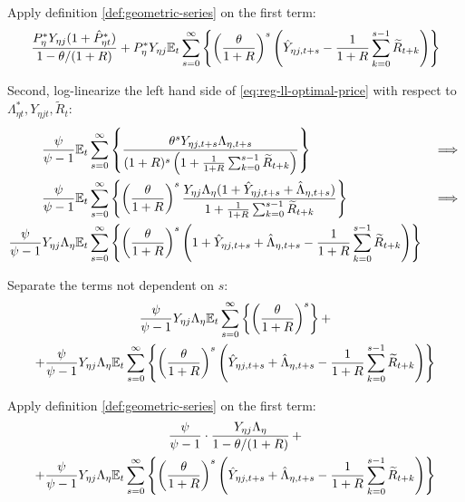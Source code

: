\documentclass[
thesis.tex
]{subfiles}
\begin{document}
Apply definition \ref{def:geometric-series} on the first term:
\begin{align}
	\frac{ P_{\eta}^{\ast} Y_{\eta j} ( 1 + \hat{P}_{\eta t}^{\ast} )}{1-\theta /(1+R)} + P_{\eta}^{\ast} Y_{\eta j} {\mathbb{E}_{t}} \sum_{s=0}^{\infty} \left\{ \left( \frac{\theta}{1 + R} \right)^s \left( \hat{Y}_{\eta j, t+s} - \frac{1}{1 + R} \sum_{k=0}^{s-1} \widetilde{R}_{t+k} \right) \right\} \nonumber
\end{align}

Second, log-linearize the left hand side of \ref{eq:reg-ll-optimal-price} with respect to \( \Lambda_{\eta t}^{\ast}, Y_{\eta j t}, \widetilde{R}_t \):
\begin{alignat}{2}
	\frac{\psi}{\psi-1} &{\mathbb{E}_{t}} \sum_{s=0}^{\infty} \left\{ \frac{\theta^s Y_{\eta j,t+s} \Lambda_{\eta, t+s}}{ (1 + R)^s \left( 1 + \frac{1}{1 + R} \sum_{k=0}^{s-1} \widetilde{R}_{t+k} \right)} \right\} & \implies \nonumber \\
	\frac{\psi}{\psi-1} &{\mathbb{E}_{t}} \sum_{s=0}^{\infty} \left\{ \left( \frac{\theta}{1 + R} \right)^s \frac{ Y_{\eta j} \Lambda_{\eta} (1+ \hat{Y}_{\eta j, t+s} + \hat{\Lambda}_{\eta, t+s})}{ 1 + \frac{1}{1 + R} \sum_{k=0}^{s-1} \widetilde{R}_{t+k}} \right\} & \implies \nonumber \\
	\frac{\psi}{\psi-1} Y_{\eta j} \Lambda_{\eta} &{\mathbb{E}_{t}} \sum_{s=0}^{\infty} \left\{ \left( \frac{\theta}{1 + R} \right)^s \left( 1+ \hat{Y}_{\eta j, t+s} + \hat{\Lambda}_{\eta, t+s} - \frac{1}{1 + R} \sum_{k=0}^{s-1} \widetilde{R}_{t+k} \right) \right\} & \nonumber
\end{alignat}

Separate the terms not dependent on $s$:
\begin{multline}
	\frac{\psi}{\psi-1} Y_{\eta j} \Lambda_{\eta} {\mathbb{E}_{t}} \sum_{s=0}^{\infty} \left\{ \left( \frac{\theta}{1 + R} \right)^s \right\} + 
	\\
	+ \frac{\psi}{\psi-1} Y_{\eta j} \Lambda_{\eta} {\mathbb{E}_{t}} \sum_{s=0}^{\infty} \left\{ \left( \frac{\theta}{1 + R} \right)^s \left( \hat{Y}_{\eta j, t+s} + \hat{\Lambda}_{\eta, t+s} - \frac{1}{1 + R} \sum_{k=0}^{s-1} \widetilde{R}_{t+k} \right) \right\} \nonumber
\end{multline}

Apply definition \ref{def:geometric-series} on the first term:
\begin{multline}
	\frac{\psi}{\psi-1} \cdot \frac{Y_{\eta j} \Lambda_{\eta}}{1-\theta /(1+R)} \, + 
	\\
	+ \frac{\psi}{\psi-1} Y_{\eta j} \Lambda_{\eta} {\mathbb{E}_{t}} \sum_{s=0}^{\infty} \left\{ \left( \frac{\theta}{1 + R} \right)^s \left( \hat{Y}_{\eta j, t+s} + \hat{\Lambda}_{\eta, t+s} - \frac{1}{1 + R} \sum_{k=0}^{s-1} \widetilde{R}_{t+k} \right) \right\} \nonumber
\end{multline}
\end{document}

